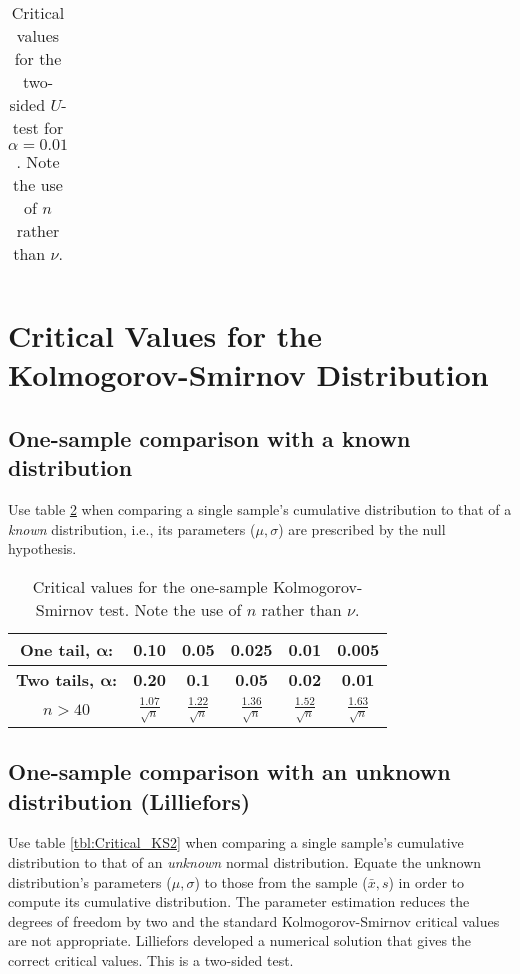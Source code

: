 \begin{table}[h]
\centering
\footnotesize
\begin{tabular}{|c|ccccccccccccccccccc|} \hline

\end{tabular}
\normalsize
\caption{Critical values for the two-sided $U$-test for $\alpha = 0.01$.  Note the use of $n$ rather than $\nu$.}
\label{tbl:Critical_U4}
\end{table}

\clearpage
\section{Critical Values for the Kolmogorov-Smirnov Distribution}

\subsection{One-sample comparison with a known distribution}
Use table \ref{tbl:Critical_KS1} when comparing a single sample's cumulative distribution to
that of a \emph{known} distribution, i.e., its parameters ($\mu, \sigma$) are prescribed
by the null hypothesis.
\begin{table}[h]
\centering
\small
\begin{tabular}{|c|ccccc|} \hline
\bf{One tail, } $\mathbf{\alpha}$:  &  \bf{0.10}  & \bf{0.05} & \bf{0.025} & \bf{0.01}  & \bf{0.005} \\ \hline
\bf{Two tails, } $\mathbf{\alpha}$:  &  \bf{0.20}  & \bf{0.1} & \bf{0.05} & \bf{0.02}  & \bf{0.01} \\ \hline

$n > 40$	&	$\frac{1.07}{\sqrt{n}}$	&	$\frac{1.22}{\sqrt{n}}$	&	$\frac{1.36}{\sqrt{n}}$	&	$\frac{1.52}{\sqrt{n}}$	&	$\frac{1.63}{\sqrt{n}}$	\\[4pt] \hline
\end{tabular}
\normalsize
\caption{Critical values for the one-sample Kolmogorov-Smirnov test.  Note the use of $n$ rather than $\nu$.}
\label{tbl:Critical_KS1}
\end{table}

\clearpage
\subsection{One-sample comparison with an unknown distribution (Lilliefors)}
Use table \ref{tbl:Critical_KS2} when comparing a single sample's cumulative distribution to
that of an \emph{unknown} normal distribution. Equate the unknown distribution's
parameters ($\mu, \sigma$) to those from the sample ($\bar{x}, s$) in order to compute its cumulative distribution.
The parameter estimation reduces the degrees of freedom by two and the standard
Kolmogorov-Smirnov critical values are not appropriate.  Lilliefors developed a numerical solution that
gives the correct critical values. This is a two-sided test.

